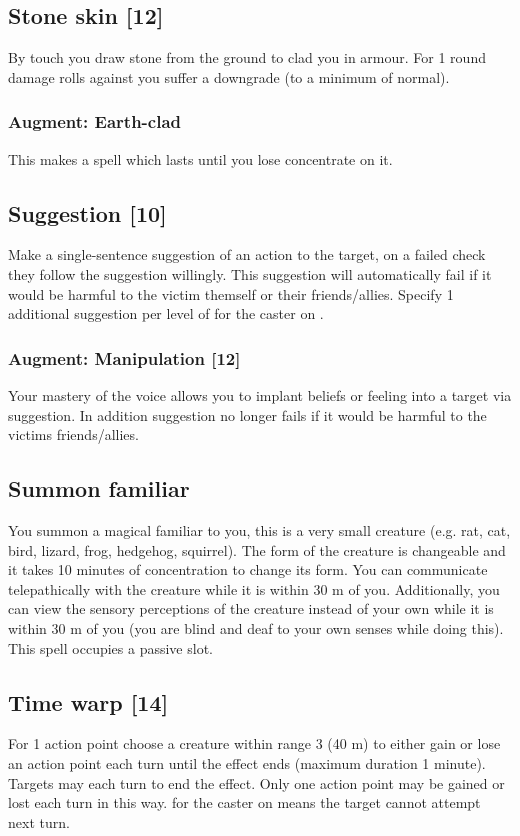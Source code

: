 \subsection{Stone skin [12]}
By touch you draw stone from the ground to clad you in armour. For 1 round damage rolls against you suffer a  downgrade (to a minimum of normal). 
\subsubsection{Augment: Earth-clad}
This makes  a  spell which lasts until you lose concentrate on it.

\subsection{Suggestion [10]}
Make a single-sentence suggestion of an action to the target, on a failed  check they follow the suggestion willingly. This suggestion will automatically fail if it would
be harmful to the victim themself or their friends/allies. Specify 1 additional suggestion per level of  for the caster on . 		
\subsubsection{Augment: Manipulation [12]}
Your mastery of the voice allows you to implant beliefs or feeling into a target via suggestion. In addition suggestion no longer fails if it would be harmful to the victims friends/allies.

\subsection{Summon familiar}
\label{spell:familiar}
You summon a magical familiar to you, this is a very small creature (e.g. rat, cat, bird, lizard, frog, hedgehog, squirrel). The form of the creature is changeable and it takes 10 minutes of concentration to change its form. You can communicate telepathically with the creature while it is within 30 m of you. Additionally, you can view the sensory perceptions of the creature instead of your own while it is within 30 m of you (you are blind and deaf to your own senses while doing this). This spell occupies a passive  slot.

\subsection{Time warp [14]}
For 1 action point choose a creature within range 3 (40 m) to either gain or lose an action point each turn until the effect ends (maximum duration 1 minute). Targets may  each turn to end the effect. Only one action point may be gained or lost each turn in this way.  for the caster on  means the target cannot attempt  next turn.
